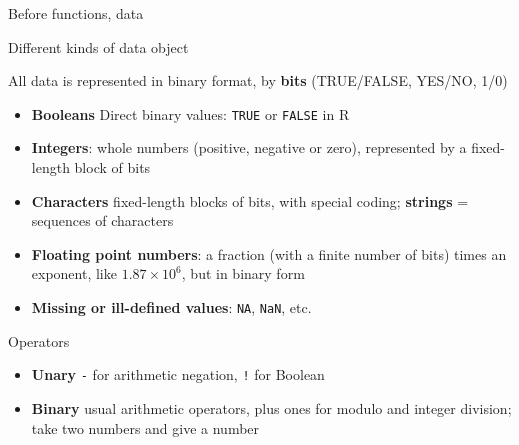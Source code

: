 \documentclass[8pt,ignorenonframetext,]{beamer}
\providecommand{\tightlist}{%
  \setlength{\itemsep}{0pt}\setlength{\parskip}{0pt}}
\begin{document}
\begin{frame}[fragile]{Before functions, data}

Different kinds of data object

All data is represented in binary format, by \textbf{bits} (TRUE/FALSE,
YES/NO, 1/0)

\begin{itemize}
\tightlist
\item
  \textbf{Booleans} Direct binary values: \texttt{TRUE} or
  \texttt{FALSE} in R
\item
  \textbf{Integers}: whole numbers (positive, negative or zero),
  represented by a fixed-length block of bits
\item
  \textbf{Characters} fixed-length blocks of bits, with special coding;
  \textbf{strings} = sequences of characters
\item
  \textbf{Floating point numbers}: a fraction (with a finite number of
  bits) times an exponent, like \(1.87 \times {10}^{6}\), but in binary
  form
\item
  \textbf{Missing or ill-defined values}: \texttt{NA}, \texttt{NaN},
  etc.
\end{itemize}

\end{frame}

\begin{frame}[fragile]{Operators}

\begin{itemize}
\tightlist
\item
  \textbf{Unary} \texttt{-} for arithmetic negation, \texttt{!} for
  Boolean
\item
  \textbf{Binary} usual arithmetic operators, plus ones for modulo and
  integer division; take two numbers and give a number
\end{itemize}

\end{frame}
\end{document}
